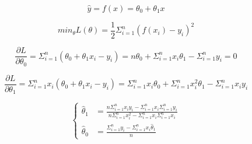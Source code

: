$$\hat{y} = f(x) = \theta_0 + \theta_1 x$$

$$min_{\theta}L(\theta) = \frac{1}{2}\Sigma_{i=1}^{n} (f(x_i) - y_i)^2$$

$$\frac{\partial L}{\partial \theta_0} = \Sigma_{i=1}^{n}(\theta_0 + \theta_1 x_i - y_i) = n\theta_0 +\Sigma_{i=1}^{n} x_i \theta_1 - \Sigma_{i=1}^{n} y_i = 0$$  

$$\frac{\partial L}{\partial \theta_1} = \Sigma_{i=1}^{n}x_i(\theta_0+\theta_1x_i-y_i) = \Sigma_{i=1}^{n}x_i \theta_0 + \Sigma_{i=1}^{n}x_i^2 \theta_1 - \Sigma_{i=1}^{n}x_iy_i$$

$$\left\{\begin{aligned}\hat\theta_1 &= \frac{n\Sigma_{i=1}^{n}x_iy_i-\Sigma_{i=1}^{n}x_i\Sigma_{i=1}^{n}y_i}{n\Sigma_{i=1}^{n}x_i^2-\Sigma_{i=1}^{n}x_i\Sigma_{i=1}^{n}x_i} \\ \hat\theta_0 &= \frac{\Sigma_{i=1}^{n}y_i - \Sigma_{i=1}^{n}x_i \hat\theta_1}{n}\end{aligned}\right.$$